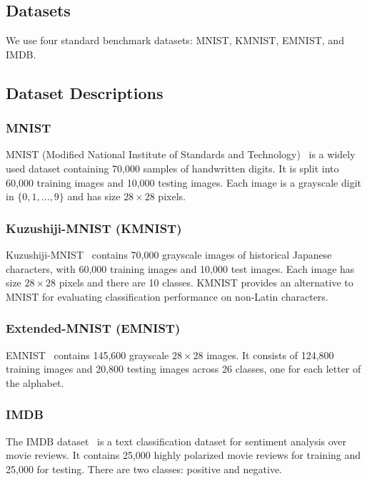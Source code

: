 \documentclass[sn-mathphys-num]{sn-jnl}%
\theoremstyle{thmstyleone}%
\theoremstyle{thmstyletwo}%
\theoremstyle{thmstylethree}%
\begin{document}
\subsection{Datasets}

We use four standard benchmark datasets: MNIST, KMNIST, EMNIST, and IMDB. 

\subsection{Dataset Descriptions} \label{dataset-desc}

\subsubsection{MNIST}
MNIST (Modified National Institute of Standards and Technology)~\cite{lecun1998gradient} is a widely used dataset containing 70,000 samples of handwritten digits. It is split into 60,000 training images and 10,000 testing images. Each image is a grayscale digit in $\{0,1,...,9\}$ and has size $28 \times 28$ pixels. 

\subsubsection{Kuzushiji-MNIST (KMNIST)}
Kuzushiji-MNIST~\cite{kmnist} contains 70,000 grayscale images of historical Japanese characters, with 60,000 training images and 10,000 test images. Each image has size $28 \times 28$ pixels and there are 10 classes. KMNIST provides an alternative to MNIST for evaluating classification performance on non-Latin characters.

\subsubsection{Extended-MNIST (EMNIST)}
EMNIST~\cite{DBLP:EMNIST} contains 145,600 grayscale $28 \times 28$ images. It consists of 124,800 training images and 20,800 testing images across 26 classes, one for each letter of the alphabet.

\subsubsection{IMDB}
The IMDB dataset~\cite{maas-EtAl:2011:ACL-HLT2011} is a text classification dataset for sentiment analysis over movie reviews. It contains 25,000 highly polarized movie reviews for training and 25,000 for testing. There are two classes: positive and negative. 
\end{document}
